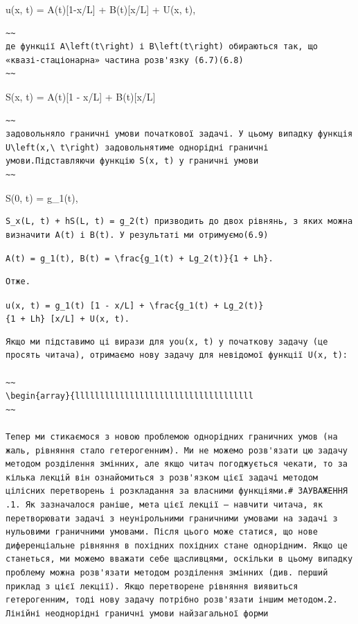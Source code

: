\documentclass[
  ukrainian,
]{article}
\begin{document}
u(x, t) = A(t){[}1-x/L{]} + B(t){[}x/L{]} + U(x, t),

\begin{verbatim}
~~
де функції A\left(t\right) і B\left(t\right) обираються так, що «квазі-стаціонарна» частина розв'язку (6.7)(6.8)
~~
\end{verbatim}

S(x, t) = A(t){[}1 - x/L{]} + B(t){[}x/L{]}

\begin{verbatim}
~~
задовольняло граничні умови початкової задачі. У цьому випадку функція U\left(x,\ t\right) задовольнятиме однорідні граничні умови.Підставляючи функцію S(x, t) у граничні умови
~~
\end{verbatim}

S(0, t) = g\_1(t),

\begin{verbatim}
S_x(L, t) + hS(L, t) = g_2(t) призводить до двох рівнянь, з яких можна визначити A(t) і B(t). У результаті ми отримуємо(6.9)
\end{verbatim}

\texttt{A(t)\ =\ g\_1(t),\ B(t)\ =\ \textbackslash{}frac\{g\_1(t)\ +\ Lg\_2(t)\}\{1\ +\ Lh\}.}

\begin{verbatim}
Отже.
\end{verbatim}

\texttt{u(x,\ t)\ =\ g\_1(t)\ {[}1\ -\ x/L{]}\ +\ \textbackslash{}frac\{g\_1(t)\ +\ Lg\_2(t)\}\{1\ +\ Lh\}\ {[}x/L{]}\ +\ U(x,\ t).}

\begin{verbatim}
Якщо ми підставимо ці вирази для you(x, t) у початкову задачу (це просять читача), отримаємо нову задачу для невідомої функції U(x, t):

~~
\begin{array}{llllllllllllllllllllllllllllllllllll
~~

Тепер ми стикаємося з новою проблемою однорідних граничних умов (на жаль, рівняння стало гетерогенним). Ми не можемо розв'язати цю задачу методом розділення змінних, але якщо читач погоджується чекати, то за кілька лекцій він ознайомиться з розв'язком цієї задачі методом цілісних перетворень і розкладання за власними функціями.# ЗАУВАЖЕННЯ .1. Як зазначалося раніше, мета цієї лекції — навчити читача, як перетворювати задачі з неунірольними граничними умовами на задачі з нульовими граничними умовами. Після цього може статися, що нове диференціальне рівняння в похідних похідних стане однорідним. Якщо це станеться, ми можемо вважати себе щасливцями, оскільки в цьому випадку проблему можна розв'язати методом розділення змінних (див. перший приклад з цієї лекції). Якщо перетворене рівняння виявиться гетерогенним, тоді нову задачу потрібно розв'язати іншим методом.2. Лінійні неоднорідні граничні умови найзагальної форми
\end{verbatim}
\end{document}
